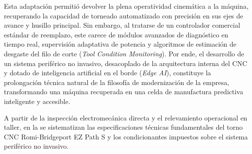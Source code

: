 Esta adaptación permitió devolver la plena operatividad cinemática a la máquina, recuperando la capacidad de torneado automatizado con precisión en sus ejes de avance y husillo principal. Sin embargo, al tratarse de un controlador comercial estándar de reemplazo, este carece de módulos avanzados de diagnóstico en tiempo real, supervisión adaptativa de potencia y algoritmos de estimación de desgaste del filo de corte (\textit{Tool Condition Monitoring}). Por ende, el desarrollo de un sistema periférico no invasivo, desacoplado de la arquitectura interna del CNC y dotado de inteligencia artificial en el borde (\textit{Edge AI}), constituye la prolongación técnica natural de la filosofía de modernización de la empresa, transformando una máquina recuperada en una celda de manufactura predictiva inteligente y accesible.

A partir de la inspección electromecánica directa y el relevamiento operacional en taller, en la  se sistematizan las especificaciones técnicas fundamentales del torno CNC Romi-Bridgeport EZ Path S y los condicionantes impuestos sobre el sistema periférico no invasivo.

